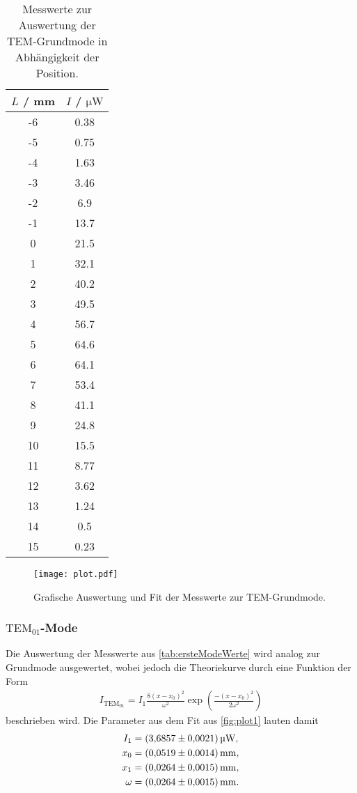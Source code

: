 \begin{table}[H]
  \centering
  \caption{Messwerte zur Auswertung der TEM-Grundmode in Abhängigkeit der Position.}
  \label{tab:grundModeWerte}
  \begin{tabular}{c c}
      \toprule
      $L$ / mm & $I$ / $\si{\micro\watt}$\\
      \midrule
      -6 & 0.38 \\
      -5 & 0.75 \\
      -4 & 1.63 \\
      -3 & 3.46 \\
      -2 & 6.9 \\
      -1 & 13.7 \\
      0 & 21.5 \\
      1 & 32.1 \\
      2 & 40.2 \\
      3 & 49.5 \\
      4 & 56.7 \\
      5 & 64.6 \\
      6 & 64.1 \\
      7 & 53.4 \\
      8 & 41.1 \\
      9 & 24.8 \\
      10 & 15.5 \\
      11 & 8.77 \\
      12 & 3.62 \\
      13 & 1.24 \\
      14 & 0.5 \\
      15 & 0.23 \\
      \bottomrule
  \end{tabular}
\end{table}

\begin{figure}[H]
  \centering
  \texttt{[image: plot.pdf]}
  \caption{Grafische Auswertung und Fit der Messwerte zur TEM-Grundmode.}
  \label{fig:plot1}
\end{figure}


\subsubsection{$\text{TEM}_{01}$-Mode}
\label{subsubsec:Mode1}
Die Auswertung der Messwerte aus \autoref{tab:ersteModeWerte} wird analog zur Grundmode ausgewertet, wobei jedoch die Theoriekurve durch eine Funktion der Form
\begin{align}
  I_{\text{TEM}_{01}} = I_1 \frac{8\left( x - x_0\right)^2}{\omega^2} \exp \left( \frac{-\left(x - x_0\right)^2}{2\omega^2} \right)
\end{align}
beschrieben wird. Die Parameter aus dem Fit aus \autoref{fig:plot1} lauten damit
\begin{align*}
  I_1&= \SI{3.6857 \pm 0.0021}{\micro\watt}, \\
  x_0 &= \SI{0.0519 \pm 0.0014}{\milli\meter}, \\
  x_1 &= \SI{0.0264 \pm 0.0015}{\milli\meter}, \\
  \omega &= \SI{0.0264 \pm 0.0015}{\milli\meter}.
\end{align*}

